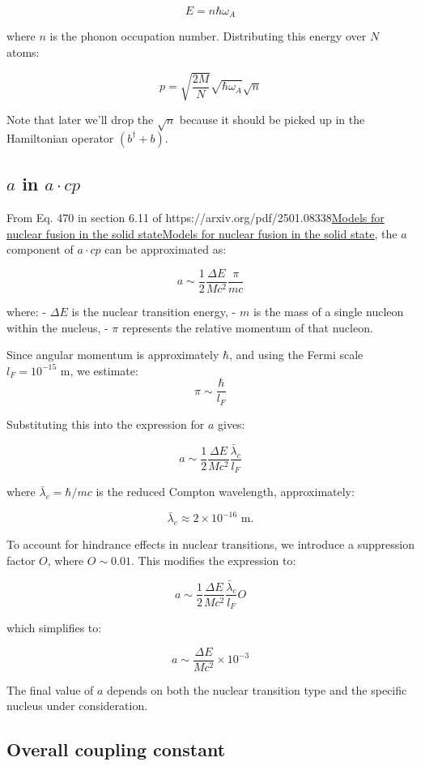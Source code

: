 \documentclass[
]{article}
\let\oldhref\href
\renewcommand{\href}[2]{\ifx#1\urlprefix\oldhref{#1}{#2}\else\uline{\oldhref{#1}{#2}}\fi}
\renewcommand{\[}{\begin{equation}}
\renewcommand{\]}{\end{equation}}
\begin{document}
\[
E = n \hbar \omega_A 
\]

where \(n\) is the phonon occupation number. Distributing this energy
over \(N\) atoms:

\[
p = \sqrt{\frac{2M}{N}} \sqrt{\hbar \omega_A} \sqrt{n} \label{eq:p}
\]

Note that later we'll drop the \(\sqrt{n}\) because it should be picked
up in the Hamiltonian operator \((b^{\dagger} + b)\).

\subsection{\texorpdfstring{\(a\) in
\(a \cdot cp\)}{a in a \textbackslash cdot cp}}\label{a-in-a-cdot-cp}

From Eq. 470 in section 6.11 of
\href{https://arxiv.org/pdf/2501.08338}{Models for nuclear fusion in the
solid state}, the \(a\) component of \(a \cdot cp\) can be approximated
as:

\[
a \sim \frac{1}{2} \frac{\Delta E}{M c^2} \frac{\pi}{m c}
\]

where: - \(\Delta E\) is the nuclear transition energy, - \(m\) is the
mass of a single nucleon within the nucleus, - \(\pi\) represents the
relative momentum of that nucleon.

Since angular momentum is approximately \(\hbar\), and using the Fermi
scale \(l_F = 10^{-15}\) m, we estimate: \[
\pi \sim \frac{\hbar}{l_F} 
\]

Substituting this into the expression for \(a\) gives:

\[
a \sim \frac{1}{2} \frac{\Delta E}{M c^2} \frac{\bar\lambda_c}{l_F} 
\]

where \(\bar\lambda_c = \hbar / m c\) is the reduced Compton wavelength,
approximately:

\[
\bar\lambda_c \approx 2 \times 10^{-16} \text{ m}. 
\]

To account for hindrance effects in nuclear transitions, we introduce a
suppression factor \(O\), where \(O \sim 0.01\). This modifies the
expression to:

\[
a \sim \frac{1}{2} \frac{\Delta E}{M c^2} \frac{\bar\lambda_c}{l_F} O 
\]

which simplifies to:

\[
a \sim \frac{\Delta E}{M c^2} \times 10^{-3} 
\label{eq:a}
\]

The final value of \(a\) depends on both the nuclear transition type and
the specific nucleus under consideration.

\subsection{Overall coupling constant}\label{overall-coupling-constant}
\end{document}
